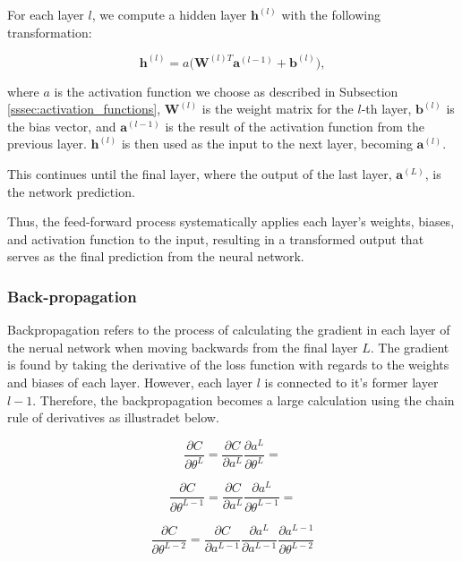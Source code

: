 For each layer \( l \), we compute a hidden layer \( \mathbf{h}^{(l)} \) with the following transformation:

\begin{equation}\label{eq:ffnn}
    \mathbf{h}^{(l)} = a \Big( \mathbf{W}^{(l)T} \mathbf{a}^{(l-1)} + \mathbf{b}^{(l)} \Big) ,
\end{equation}

where \( a \) is the activation function we choose as described in Subsection \ref{sssec:activation_functions}, 
\( \mathbf{W}^{(l)} \) is the weight matrix for the \( l \)-th layer, \( \mathbf{b}^{(l)} \) is the bias vector, 
and \( \mathbf{a}^{(l-1)} \) is the result of the activation function from the previous layer. 
\( \mathbf{h}^{(l)} \) is then used as the input to the next layer, becoming \( \mathbf{a}^{(l)} \).

This continues until the final layer, where the output of the last layer,
 \( \mathbf{a}^{(L)} \), is the network prediction. 

Thus, the feed-forward process systematically applies each layer’s weights, biases, and activation function 
to the input, resulting in a transformed output that serves as the final prediction from the neural network.

\subsubsection{Back-propagation}\label{sssec:backpropagation}

Backpropagation refers to the process of calculating the gradient in each layer of the nerual network when
moving backwards from the final layer $L$. The gradient is found by taking the derivative of the 
loss function with regards to the weights and biases of each layer. However, each layer $l$ is connected to
it's former layer $l-1$. Therefore, the backpropagation becomes a large calculation using the chain rule of 
derivatives as illustradet below. 

\[
\frac{\partial C}{\partial \theta^L} = \frac{\partial C}{\partial a^L} \frac{\partial a^L}{\partial \theta^L} = 
\]

\[
\frac{\partial C}{\partial \theta^{L-1}} = \frac{\partial C}{\partial a^L} \frac{\partial a^L}{\partial \theta^{L-1}} = 
\]

\[
\frac{\partial C}{\partial \theta^{L-2}} = \frac{\partial C}{\partial a^{L-1}} \frac{\partial a^L}{\partial a^{L-1}} \frac{\partial a^{L-1}}{\partial \theta^{L-2}}
\]

